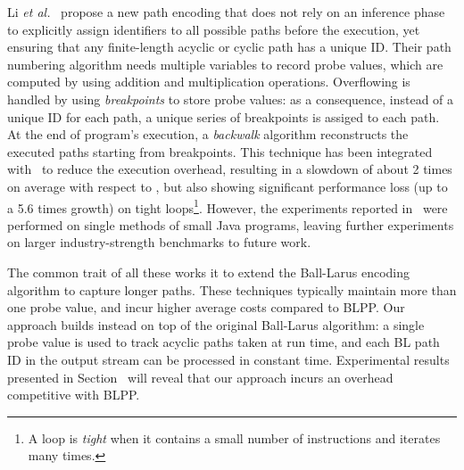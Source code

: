 Li {\em et al.}~\cite{Li12} propose a new path encoding that does not rely on an inference phase to explicitly assign identifiers to all possible paths before the execution, yet ensuring that any finite-length acyclic or cyclic path has a unique ID. Their path numbering algorithm needs multiple variables to record probe values, which are computed by using addition and multiplication operations. Overflowing is handled by using {\em breakpoints} to store probe values: as a consequence, instead of a unique ID for each path, a unique series of breakpoints is assiged to each path. At the end of program's execution, a {\em backwalk} algorithm reconstructs the executed paths starting from breakpoints. This technique has been integrated with \blpp\ to reduce the execution overhead, resulting in a slowdown of about 2 times on average with respect to \blpp, but also showing significant performance loss (up to a 5.6 times growth) on tight loops\footnote{A loop is {\em tight} when it contains a small number of instructions and iterates many times.}. However, the experiments reported in~\cite{Li12} were performed on single methods of small Java programs, leaving further experiments on larger industry-strength benchmarks to future work.

The common trait of all these works it to extend the Ball-Larus encoding algorithm to capture longer paths. These techniques typically maintain more than one probe value, and incur higher average costs compared to BLPP. Our approach builds instead on top of the original Ball-Larus algorithm: a single probe value is used to track acyclic paths taken at run time, and each BL path ID in the output stream can be processed in constant time. Experimental results presented in Section \missing\ will reveal that our approach incurs an overhead competitive with BLPP.


